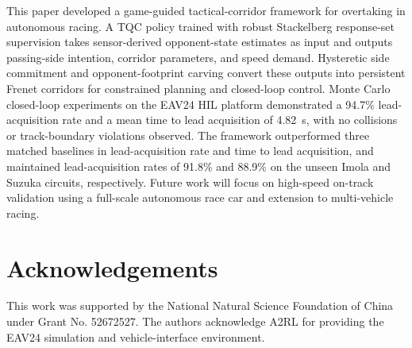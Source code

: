 \documentclass[journal,twoside,web]{ieeecolor}
\begin{document}


This paper developed a game-guided tactical-corridor framework for overtaking in autonomous racing. A TQC policy trained with robust Stackelberg response-set supervision takes sensor-derived opponent-state estimates as input and outputs passing-side intention, corridor parameters, and speed demand. Hysteretic side commitment and opponent-footprint carving convert these outputs into persistent Frenet corridors for constrained planning and closed-loop control.
Monte Carlo closed-loop experiments on the EAV24 HIL platform demonstrated a 94.7\% lead-acquisition rate and a mean time to lead acquisition of 4.82~s, with no collisions or track-boundary violations observed. The framework outperformed three matched baselines in lead-acquisition rate and time to lead acquisition, and maintained lead-acquisition rates of 91.8\% and 88.9\% on the unseen Imola and Suzuka circuits, respectively.
Future work will focus on high-speed on-track validation using a full-scale autonomous race car and extension to multi-vehicle racing.



\section*{Acknowledgements}
This work was supported by the National Natural Science Foundation of China under Grant No. 52672527.
The authors acknowledge A2RL for providing the EAV24 simulation and vehicle-interface environment.
\end{document}
